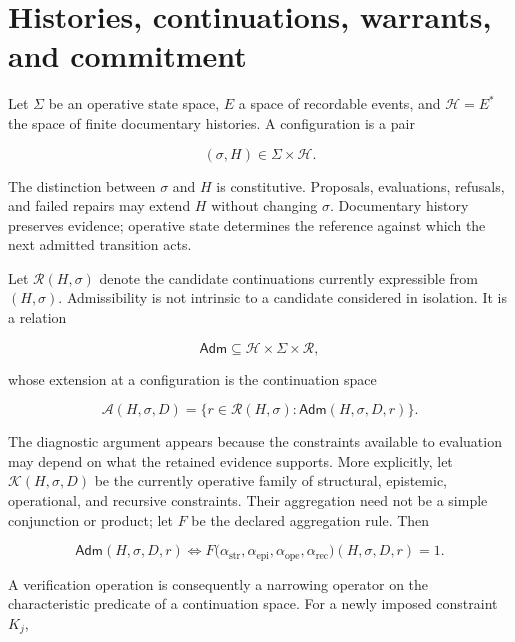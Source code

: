 \documentclass[11pt]{article}
\begin{document}
\section{Histories, continuations, warrants, and commitment}

Let $\Sigma$ be an operative state space, $E$ a space of recordable events, and $\mathcal H=E^{*}$ the space of finite documentary histories. A configuration is a pair

\begin{equation}
(\sigma,H)\in\Sigma\times\mathcal H.
\end{equation}

The distinction between $\sigma$ and $H$ is constitutive. Proposals, evaluations, refusals, and failed repairs may extend $H$ without changing $\sigma$. Documentary history preserves evidence; operative state determines the reference against which the next admitted transition acts.

Let $\mathcal R(H,\sigma)$ denote the candidate continuations currently expressible from $(H,\sigma)$. Admissibility is not intrinsic to a candidate considered in isolation. It is a relation

\begin{equation}
\mathsf{Adm}\subseteq
\mathcal H\times\Sigma\times\mathcal R,
\end{equation}

whose extension at a configuration is the continuation space

\begin{equation}
\mathcal A(H,\sigma,D)
=
\{r\in\mathcal R(H,\sigma):
\mathsf{Adm}(H,\sigma,D,r)\}.
\label{eq:admissible-set}
\end{equation}

The diagnostic argument appears because the constraints available to evaluation may depend on what the retained evidence supports. More explicitly, let $\mathcal K(H,\sigma,D)$ be the currently operative family of structural, epistemic, operational, and recursive constraints. Their aggregation need not be a simple conjunction or product; let $F$ be the declared aggregation rule. Then

\begin{equation}
\mathsf{Adm}(H,\sigma,D,r)
\Longleftrightarrow
F\bigl(
\alpha_{\mathrm{str}},
\alpha_{\mathrm{epi}},
\alpha_{\mathrm{ope}},
\alpha_{\mathrm{rec}}
\bigr)(H,\sigma,D,r)=1.
\end{equation}

A verification operation is consequently a narrowing operator on the characteristic predicate of a continuation space. For a newly imposed constraint $K_j$,
\end{document}
